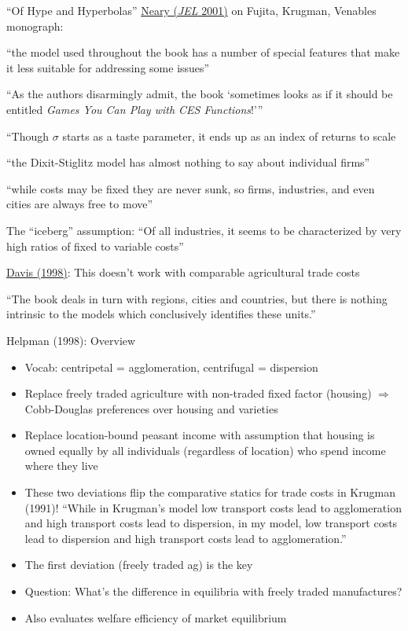 \documentclass[11pt,notes=hide,aspectratio=169]{beamer}
\begin{document}
\begin{frame}{``Of Hype and Hyperbolas''}
\href{https://www.aeaweb.org/articles?id=10.1257/jel.39.2.536}{Neary (\textit{JEL} 2001)} on Fujita, Krugman, Venables monograph:
\begin{itemize}
{\small
\item ``the model used throughout the book has a number of special features that make it less suitable for addressing some issues''
\item ``As the authors disarmingly admit, the book `sometimes looks as if it should be entitled \textit{Games You Can Play with CES Functions}!'''
\item ``Though $\sigma$ starts as a taste parameter, it ends up as an index of returns to scale
\item ``the Dixit-Stiglitz model has almost nothing to say about individual firms''
\item ``while costs may be fixed they are never sunk, so firms, industries, and even cities are always free to move''
\item The ``iceberg'' assumption: ``Of all industries, it seems to be characterized by very high ratios of fixed to variable costs''
\item \href{https://www.jstor.org/stable/116870}{Davis (1998)}: This doesn't work with comparable agricultural trade costs
\item ``The book deals in turn with regions, cities and countries, but there is nothing intrinsic to the models which conclusively identifies these units.''
}
\end{itemize}
\end{frame}
\begin{frame}{Helpman (1998): Overview}
\begin{itemize}
	\item Vocab: centripetal = agglomeration, centrifugal  = dispersion
	\item Replace freely traded agriculture with non-traded fixed factor (housing) $\Rightarrow$ Cobb-Douglas preferences over housing and varieties
	\item Replace location-bound peasant income with assumption that housing is owned equally by all individuals (regardless of location) who spend income where they live
	\item These two deviations flip the comparative statics for trade costs in Krugman (1991)! ``While in Krugman's model low transport costs lead to agglomeration and high transport costs lead to dispersion, in my model, low transport costs lead to dispersion and high transport costs lead to agglomeration.''
	\item The first deviation (freely traded ag) is the key
	\item Question: What's the difference in equilibria with freely traded manufactures?
	\item Also evaluates welfare efficiency of market equilibrium
\end{itemize}
\end{frame}
\end{document}
